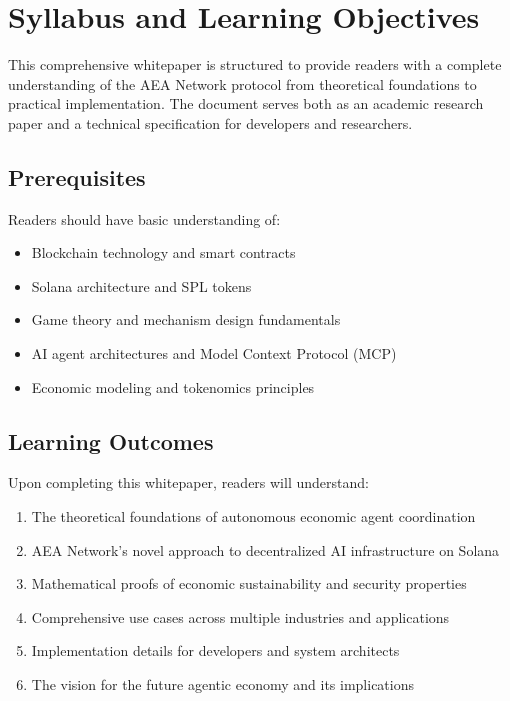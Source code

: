 \documentclass[12pt,a4paper]{article}
\begin{document}
\newpage
\tableofcontents
\newpage

\section{Syllabus and Learning Objectives}

This comprehensive whitepaper is structured to provide readers with a complete understanding of the AEA Network protocol from theoretical foundations to practical implementation. The document serves both as an academic research paper and a technical specification for developers and researchers.

\subsection{Prerequisites}
Readers should have basic understanding of:
\begin{itemize}
\item Blockchain technology and smart contracts
\item Solana architecture and SPL tokens
\item Game theory and mechanism design fundamentals
\item AI agent architectures and Model Context Protocol (MCP)
\item Economic modeling and tokenomics principles
\end{itemize}

\subsection{Learning Outcomes}
Upon completing this whitepaper, readers will understand:
\begin{enumerate}
\item The theoretical foundations of autonomous economic agent coordination
\item AEA Network's novel approach to decentralized AI infrastructure on Solana
\item Mathematical proofs of economic sustainability and security properties
\item Comprehensive use cases across multiple industries and applications
\item Implementation details for developers and system architects
\item The vision for the future agentic economy and its implications
\end{enumerate}
\end{document}
